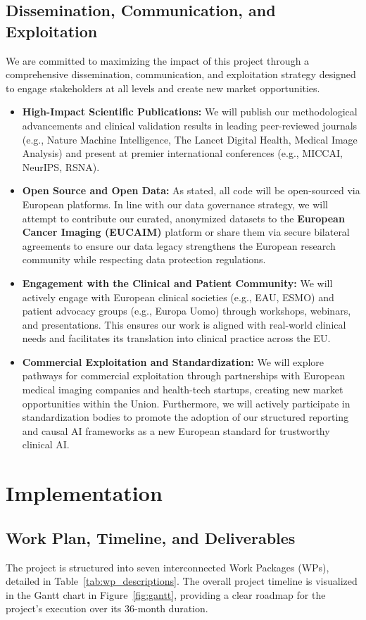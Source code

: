 \documentclass[11pt, a4paper]{article}
\begin{document}
\subsection{Dissemination, Communication, and Exploitation}
We are committed to maximizing the impact of this project through a comprehensive dissemination, communication, and exploitation strategy designed to engage stakeholders at all levels and create new market opportunities.
\begin{itemize}
    \item \textbf{High-Impact Scientific Publications:} We will publish our methodological advancements and clinical validation results in leading peer-reviewed journals (e.g., Nature Machine Intelligence, The Lancet Digital Health, Medical Image Analysis) and present at premier international conferences (e.g., MICCAI, NeurIPS, RSNA).
    \item \textbf{Open Source and Open Data:} As stated, all code will be open-sourced via European platforms. In line with our data governance strategy, we will attempt to contribute our curated, anonymized datasets to the \textbf{European Cancer Imaging (EUCAIM)} platform or share them via secure bilateral agreements to ensure our data legacy strengthens the European research community while respecting data protection regulations.
    \item \textbf{Engagement with the Clinical and Patient Community:} We will actively engage with European clinical societies (e.g., EAU, ESMO) and patient advocacy groups (e.g., Europa Uomo) through workshops, webinars, and presentations. This ensures our work is aligned with real-world clinical needs and facilitates its translation into clinical practice across the EU.
    \item \textbf{Commercial Exploitation and Standardization:} We will explore pathways for commercial exploitation through partnerships with European medical imaging companies and health-tech startups, creating new market opportunities within the Union. Furthermore, we will actively participate in standardization bodies to promote the adoption of our structured reporting and causal AI frameworks as a new European standard for trustworthy clinical AI.
\end{itemize}

\section{Implementation}

\subsection{Work Plan, Timeline, and Deliverables}
The project is structured into seven interconnected Work Packages (WPs), detailed in Table~\ref{tab:wp_descriptions}. The overall project timeline is visualized in the Gantt chart in Figure~\ref{fig:gantt}, providing a clear roadmap for the project's execution over its 36-month duration.
\end{document}
